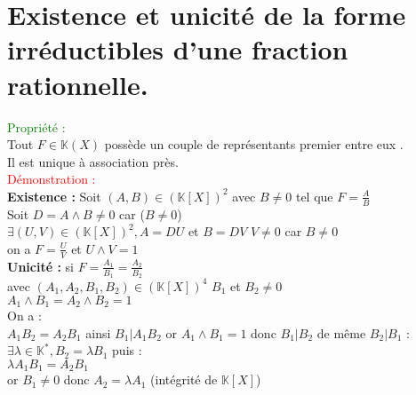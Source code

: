 \documentclass{article}
\begin{document}
\section{Existence et unicité de la forme irréductibles d'une fraction rationnelle.}
\textcolor{green}{Propriété :} \\
Tout $F \in \mathbb K (X)$ possède un couple de représentants premier entre eux . \\
Il est unique à association près. \\
\textcolor{red}{Démonstration :}\\
{\bf Existence : }Soit $(A,B) \in (\mathbb K[X])^2$ avec $B \neq 0$ tel que $F=\frac{A}{B}$ \\
Soit $D=A \wedge B \neq 0$ car ($B \neq 0$) \\
$\exists (U,V) \in (\mathbb K [X])^2, A=DU$ et $B=DV$ $V \neq 0$ car $B \neq 0$ \\
on a $F= \frac{U}{V}$ et $U \wedge V=1$ \\
{\bf Unicité :} si $F=\frac{A_1}{B_1}=\frac{A_2}{B_2}$ \\
avec $(A_1,A_2,B_1,B_2) \in (\mathbb K [X])^4$ $B_1$ et $B_2 \neq 0$ \\
$A_1 \wedge B_1= A_2 \wedge B_2=1$ \\
On a : \\
$A_1B_2=A_2B_1$ ainsi $B_1|A_1B_2$ or $A_1 \wedge B_1=1$ donc $B_1|B_2$ de même $B_2|B_1$ :\\
$\exists \lambda \in \mathbb K^*,B_2= \lambda B_1$ puis : \\
$\lambda A_1 B_1=A_2B_1$ \\
or $B_1 \neq 0$ donc $A_2= \lambda A_1$ (intégrité de $\mathbb K [X]$)
\end{document}
